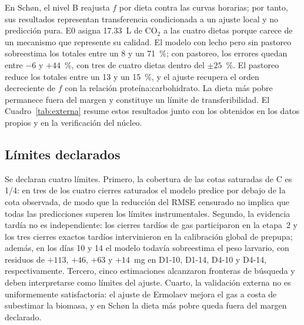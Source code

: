 En Schøn, el nivel B reajusta $f$ por dieta contra las curvas horarias; por tanto, sus resultados representan transferencia condicionada a un ajuste local y no predicción pura. E0 asigna 17.33~L de CO$_2$ a las cuatro dietas porque carece de un mecanismo que represente su calidad. El modelo con lecho pero sin pastoreo sobreestima los totales entre un 8 y un 71~\%; con pastoreo, los errores quedan entre $-6$ y $+44$~\%, con tres de cuatro dietas dentro del $\pm 25$~\%. El pastoreo reduce los totales entre un 13 y un 15~\%, y el ajuste recupera el orden decreciente de $f$ con la relación proteína:carbohidrato. La dieta más pobre permanece fuera del margen y constituye un límite de transferibilidad. El Cuadro~\ref{tab:externa} resume estos resultados junto con los obtenidos en los datos propios y en la verificación del núcleo.

\subsection{Límites declarados}
\label{sec:limites}

Se declaran cuatro límites. Primero, la cobertura de las cotas saturadas de C es 1/4: en tres de los cuatro cierres saturados el modelo predice por debajo de la cota observada, de modo que la reducción del RMSE censurado no implica que todas las predicciones superen los límites instrumentales. Segundo, la evidencia tardía no es independiente: los cierres tardíos de gas participaron en la etapa~2 y los tres cierres exactos tardíos intervinieron en la calibración global de prepupa; además, en los días 10 y 14 el modelo todavía sobreestima el peso larvario, con residuos de $+113$, $+46$, $+63$ y $+14$~mg en D1-10, D1-14, D4-10 y D4-14, respectivamente. Tercero, cinco estimaciones alcanzaron fronteras de búsqueda y deben interpretarse como límites del ajuste. Cuarto, la validación externa no es uniformemente satisfactoria: el ajuste de Ermolaev mejora el gas a costa de subestimar la biomasa, y en Schøn la dieta más pobre queda fuera del margen declarado.

